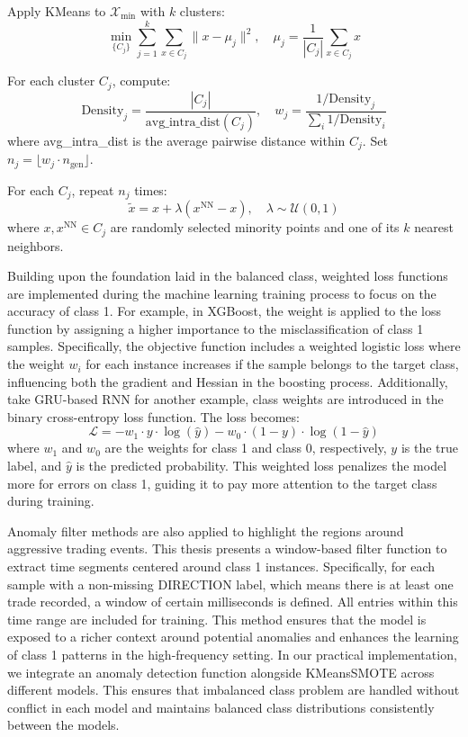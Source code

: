 Apply KMeans to $\mathcal{X}_{\text{min}}$ with $k$ clusters:
  \[
  \min_{\{C_j\}} \sum_{j=1}^k \sum_{x \in C_j} \|x - \mu_j\|^2, \quad \mu_j = \frac{1}{|C_j|} \sum_{x \in C_j} x
  \]

For each cluster $C_j$, compute:
  \[
  \text{Density}_j = \frac{|C_j|}{\text{avg\_intra\_dist}(C_j)}, \quad w_j = \frac{1/\text{Density}_j}{\sum_{i} 1/\text{Density}_i}
  \]
where avg\_intra\_dist is the average pairwise distance within $C_j$. Set $n_j = \lfloor w_j \cdot n_{\text{gen}} \rfloor$.

For each $C_j$, repeat $n_j$ times:
  \[
  \tilde{x} = x + \lambda (x^{\text{NN}} - x), \quad \lambda \sim \mathcal{U}(0, 1)
  \]
where $x, x^{\text{NN}} \in C_j$ are randomly selected minority points and one of its $k$ nearest neighbors.

Building upon the foundation laid in the balanced class, weighted loss functions are implemented during the machine learning training process to focus on the accuracy of class 1. For example, in XGBoost, the weight is applied to the loss function by assigning a higher importance to the misclassification of class 1 samples. Specifically, the objective function includes a weighted logistic loss where the weight $w_i$ for each instance increases if the sample belongs to the target class, influencing both the gradient and Hessian in the boosting process. Additionally, take GRU-based RNN for another example, class weights are introduced in the binary cross-entropy loss function. The loss becomes:
\[
\mathcal{L} = -w_1 \cdot y \cdot \log(\hat{y}) - w_0 \cdot (1 - y) \cdot \log(1 - \hat{y})
\]
where $w_1$ and $w_0$ are the weights for class 1 and class 0, respectively, $y$ is the true label, and $\hat{y}$ is the predicted probability. This weighted loss penalizes the model more for errors on class 1, guiding it to pay more attention to the target class during training.

Anomaly filter methods are also applied to highlight the regions around aggressive trading events. This thesis presents a window-based filter function to extract time segments centered around class 1 instances. Specifically, for each sample with a non-missing DIRECTION label, which means there is at least one trade recorded, a window of certain milliseconds is defined. All entries within this time range are included for training. This method ensures that the model is exposed to a richer context around potential anomalies and enhances the learning of class 1 patterns in the high-frequency setting. In our practical implementation, we integrate an anomaly detection function alongside KMeansSMOTE across different models. This ensures that imbalanced class problem are handled without conflict in each model and maintains balanced class distributions consistently between the models.

